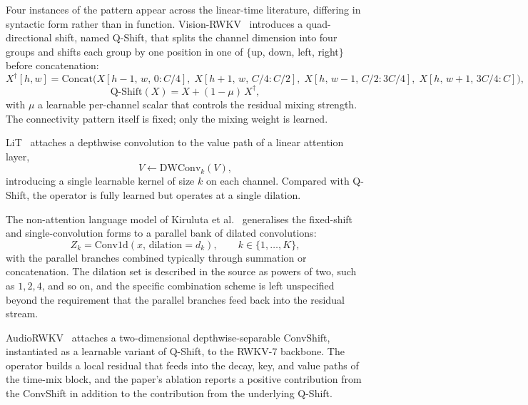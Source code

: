 Four instances of the pattern appear across the linear-time literature,
differing in syntactic form rather than in function.
Vision-RWKV~\cite{duan2024visionrwkv} introduces a quad-directional
shift, named Q-Shift, that splits the channel dimension into four
groups and shifts each group by one position in one of $\{$up, down,
left, right$\}$ before concatenation:
\begin{equation}\label{eq:qshift-shift}
X^{\dagger}[h, w] = \mathrm{Concat}\big(X[h{-}1,\, w,\, 0{:}C/4],\; X[h{+}1,\, w,\, C/4{:}C/2],\; X[h,\, w{-}1,\, C/2{:}3C/4],\; X[h,\, w{+}1,\, 3C/4{:}C]\big),
\end{equation}
\begin{equation}\label{eq:qshift-mix}
\mathrm{Q\text{-}Shift}(X) = X + (1 - \mu) \, X^{\dagger},
\end{equation}
with $\mu$ a learnable per-channel scalar that controls the residual
mixing strength. The connectivity pattern itself is fixed; only the
mixing weight is learned.

LiT~\cite{wang2025lit} attaches a depthwise convolution to the value
path of a linear attention layer,
\begin{equation}\label{eq:lit-vconv}
V \leftarrow \mathrm{DWConv}_{k}(V),
\end{equation}
introducing a single learnable kernel of size $k$ on each channel.
Compared with Q-Shift, the operator is fully learned but operates at a
single dilation.

The non-attention language model of Kiruluta et
al.~\cite{kiruluta2025breaking} generalises the fixed-shift and
single-convolution forms to a parallel bank of dilated convolutions:
\begin{equation}\label{eq:multi-resolution}
Z_{k} = \mathrm{Conv1d}(x,\, \mathrm{dilation} = d_{k}), \qquad k \in \{1, \ldots, K\},
\end{equation}
with the parallel branches combined typically through summation or
concatenation. The dilation set is described in the source as powers
of two, such as $1, 2, 4$, and so on, and the specific combination
scheme is left unspecified beyond the requirement that the parallel
branches feed back into the residual stream.

AudioRWKV~\cite{xiong2025audiorwkv} attaches a two-dimensional
depthwise-separable ConvShift, instantiated as a learnable variant of
Q-Shift, to the RWKV-7 backbone. The operator builds a local residual
that feeds into the decay, key, and value paths of the time-mix
block, and the paper's ablation reports a positive contribution from
the ConvShift in addition to the contribution from the underlying
Q-Shift.

